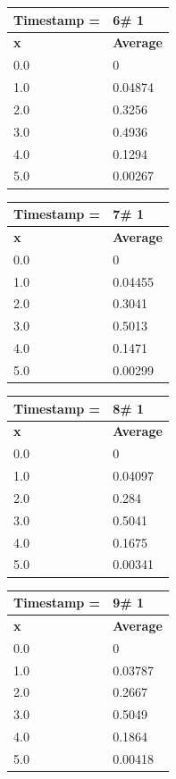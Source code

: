 \begin{tabular}{|l||l|}
\hline
\textbf{Timestamp =} & \textbf{6}\# 1\\\hline
	\textbf{x} & \textbf{Average} \\ \hline
\hline
	0.0 & 0 \\ \hline
	1.0 & 0.04874 \\ \hline
	2.0 & 0.3256 \\ \hline
	3.0 & 0.4936 \\ \hline
	4.0 & 0.1294 \\ \hline
	5.0 & 0.00267 \\ \hline
\end{tabular}
\begin{tabular}{|l||l|}
\hline
\textbf{Timestamp =} & \textbf{7}\# 1\\\hline
	\textbf{x} & \textbf{Average} \\ \hline
\hline
	0.0 & 0 \\ \hline
	1.0 & 0.04455 \\ \hline
	2.0 & 0.3041 \\ \hline
	3.0 & 0.5013 \\ \hline
	4.0 & 0.1471 \\ \hline
	5.0 & 0.00299 \\ \hline
\end{tabular}

\begin{tabular}{|l||l|}
\hline
\textbf{Timestamp =} & \textbf{8}\# 1\\\hline
	\textbf{x} & \textbf{Average} \\ \hline
\hline
	0.0 & 0 \\ \hline
	1.0 & 0.04097 \\ \hline
	2.0 & 0.284 \\ \hline
	3.0 & 0.5041 \\ \hline
	4.0 & 0.1675 \\ \hline
	5.0 & 0.00341 \\ \hline
\end{tabular}
\begin{tabular}{|l||l|}
\hline
\textbf{Timestamp =} & \textbf{9}\# 1\\\hline
	\textbf{x} & \textbf{Average} \\ \hline
\hline
	0.0 & 0 \\ \hline
	1.0 & 0.03787 \\ \hline
	2.0 & 0.2667 \\ \hline
	3.0 & 0.5049 \\ \hline
	4.0 & 0.1864 \\ \hline
	5.0 & 0.00418 \\ \hline
\end{tabular}

